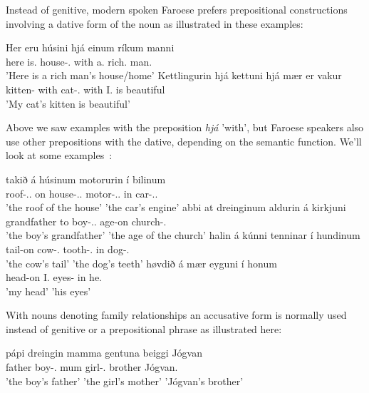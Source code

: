 \documentclass[12pt,%
]{lin-v2/lin}
\begin{document}
Instead of genitive, modern spoken Faroese prefers prepositional constructions involving a dative form of the noun as
illustrated in these examples:
\begin{exe}
    \ex
    \gll Her eru húsini hjá einum ríkum manni\\
    here is.\Pl{} house-\Det.\Pl{} with a.\Dat{} rich.\Dat{} man.\Dat{}\\
    'Here is a rich man'{}s house/home'
    \gll Kettlingurin hjá kettuni hjá mær er vakur\\
    kitten-\Det{} with cat-\Det{}.\Dat{} with I.\Dat{} is beautiful\\
    'My cat'{}s kitten is beautiful'
\end{exe}

Above we saw examples with the preposition \emph{hjá} 'with', but Faroese speakers also use other prepositions with the dative,
depending on the semantic function. We'll look at some examples~\citep{faroese}:
\begin{exe}
    \ex
    \gll takið á húsinum motorurin í bilinum\\
    roof-\Det{}.\Nom.\N{} on house-\Det{}.\Dat{}.\N{} motor-\Det{}.\Nom{}.\M{} in car-\Det.\Dat.\M\\
    \trans 'the roof of the house' 'the car'{}s engine'
    \gll abbi at dreinginum aldurin á kirkjuni\\
    grandfather to boy-\Det.\M.\Dat{} age-\Det on church-\Det.\Dat\\
    \trans 'the boy'{}s grandfather' 'the age of the church' 
    \gll halin á kúnni tenninar í hundinum\\
    tail-\Det on cow-\Det.\Dat{} tooth-\Det.\Pl{} in dog-\Det.\Dat\\
    \trans 'the cow'{}s tail' 'the dog'{}s teeth'
    \gll høvdið á mær eyguni í honum\\
    head-\Det on I.\Dat{} eyes-\Det{} in he.\Dat\\
    \trans 'my head' 'his eyes'
\end{exe}

With nouns denoting family relationships an accusative form is normally used instead of genitive or a prepositional phrase
as illustrated here:
\begin{exe}
    \ex
    \gll pápi dreingin mamma gentuna beiggi Jógvan\\
    father boy-\Det.\Acc{} mum girl-\Det.\Acc{} brother Jógvan.\Acc\\
    \trans 'the boy'{}s father' 'the girl'{}s mother' 'Jógvan'{}s brother'
\end{exe}
\end{document}

